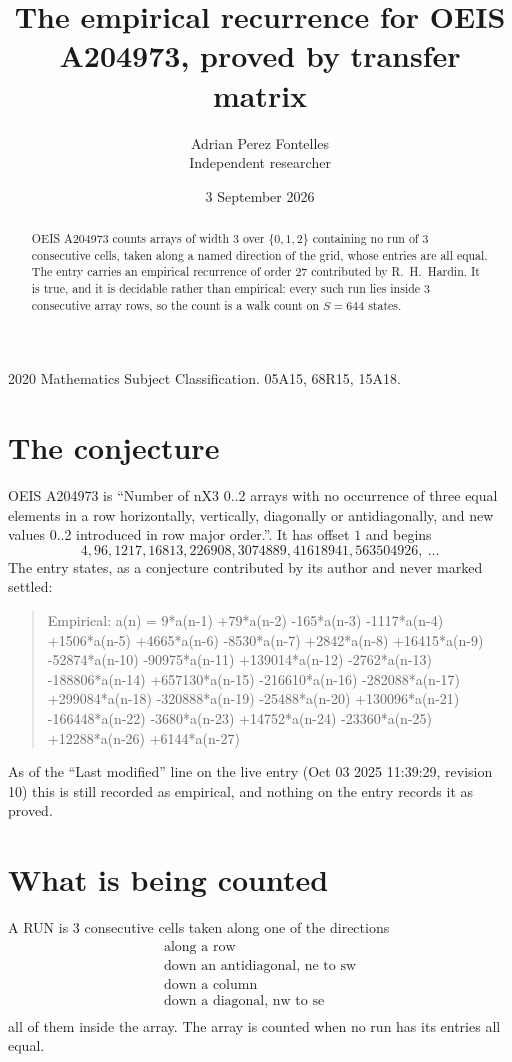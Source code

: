 \documentclass[11pt,a4paper]{article}
\title{The empirical recurrence for OEIS A204973, proved by transfer matrix}
\author{Adrian Perez Fontelles\\ \small Independent researcher}
\date{3 September 2026}
\theoremstyle{plain}
\theoremstyle{definition}
\begin{document}
\maketitle

\begin{abstract}
OEIS A204973 counts arrays of width $3$ over $\{0,1,2\}$ containing no run of $3$ consecutive
cells, taken along a named direction of the grid, whose entries are all equal. The entry carries
an empirical recurrence of order $27$ contributed by R.~H.~Hardin. It is true, and it is
decidable rather than empirical: every such run lies inside $3$ consecutive array rows, so
the count is a walk count on $S=644$ states.
\end{abstract}

\noindent\small 2020 Mathematics Subject Classification. 05A15, 68R15, 15A18.\normalsize

\section{The conjecture}

OEIS A204973 is ``Number of nX3 0..2 arrays with no occurrence of three equal elements in a row horizontally, vertically, diagonally or antidiagonally, and new values 0..2 introduced in row major order.''. It has offset $1$ and begins
\[
4, 96, 1217, 16813, 226908, 3074889, 41618941, 563504926,\ \dots
\]
The entry states, as a conjecture contributed by its author and never marked settled:
\begin{quote}
Empirical: a(n) = 9*a(n-1) +79*a(n-2) -165*a(n-3) -1117*a(n-4) +1506*a(n-5) +4665*a(n-6) -8530*a(n-7) +2842*a(n-8) +16415*a(n-9) -52874*a(n-10) -90975*a(n-11) +139014*a(n-12) -2762*a(n-13) -188806*a(n-14) +657130*a(n-15) -216610*a(n-16) -282088*a(n-17) +299084*a(n-18) -320888*a(n-19) -25488*a(n-20) +130096*a(n-21) -166448*a(n-22) -3680*a(n-23) +14752*a(n-24) -23360*a(n-25) +12288*a(n-26) +6144*a(n-27)
\end{quote}
As of the ``Last modified'' line on the live entry (Oct 03 2025 11:39:29, revision 10) this is still
recorded as empirical, and nothing on the entry records it as proved.

\section{What is being counted}

A RUN is $3$ consecutive cells taken along one of the directions
\[
\begin{array}{l}
\text{along a row} \\
\text{down an antidiagonal, ne to sw} \\
\text{down a column} \\
\text{down a diagonal, nw to se} \\
\end{array}
\]
all of them inside the array. The array is counted when no run has its entries all equal.
\end{document}
